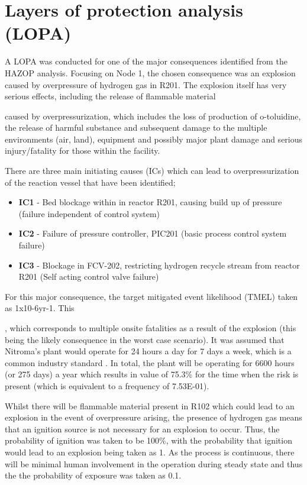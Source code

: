 \section{Layers of protection analysis (LOPA)}

A LOPA was conducted for one of the major consequences identified from the HAZOP analysis. Focusing on Node 1, the chosen consequence was an explosion caused by overpressure of hydrogen gas in R201. The explosion itself has very serious effects, including the release of flammable material 

caused by overpressurization, which includes the loss of production of o-toluidine, the release of harmful substance and subsequent damage to the multiple environments (air, land), equipment and possibly major plant damage and serious injury/fatality for those within the facility. 

There are three main initiating causes (ICs) which can lead to overpressurization of the reaction vessel that have been identified;

\begin{itemize}
\item \textbf{IC1} - Bed blockage within in reactor R201, causing build up of pressure (failure independent of control system)
\item \textbf{IC2} - Failure of pressure controller, PIC201 (basic process control system failure)
\item \textbf{IC3 }- Blockage in FCV-202, restricting hydrogen recycle stream from reactor R201 (Self acting control valve failure)

\end{itemize}
For this major consequence, the target mitigated event likelihood (TMEL) taken as 1x10-6yr-1. This 
 
 , which corresponds to multiple onsite fatalities as a result of the explosion (this being the likely consequence in the worst case scenario). It was assumed that Nitroma's plant would operate for 24 hours a day for 7 days a week, which is a common industry standard \cite{job_guide_chemical_2021}. In total, the plant will be operating for 6600 hours (or 275 days) a year which results in value of 75.3\% for the time when the risk is present (which is equivalent to a frequency of 7.53E-01).  
 
Whilst there will be flammable material present in R102 which could lead to an explosion in the event of overpressure arising, the presence of hydrogen gas means that an ignition source is not necessary for an explosion to occur. Thus, the probability of ignition was taken to be 100\%, with the probability that ignition would lead to an explosion being taken as 1. As the process is continuous, there will be minimal human involvement in the operation during steady state and thus the the probability of exposure was taken as 0.1. 
 
